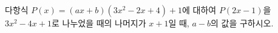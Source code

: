 다항식 $P(x)=(ax+b)(3x^2-2x+4)+1$에 대하여 $P(2x-1)$을 $3x^2-4x+1$로 나누었을 때의 나머지가 $x+1$일 때, $a-b$의 값을 구하시오. 
